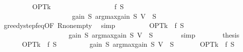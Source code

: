 \begin{isabellebody}
\ \ \ \ \isamarkupfalse%
\ \isamarkupfalse%
\ {\isachardoublequoteopen}{\isasymdots}\ {\isacharequal}{\kern0pt}\ OPT{\isacharunderscore}{\kern0pt}k\isanewline
\ \ \ \ \ \ \ \ \ \ \ \ \ \ \ \ \ {\isacharminus}{\kern0pt}\ {\isacharparenleft}{\kern0pt}f\ {\isacharquery}{\kern0pt}S\isanewline
\ \ \ \ \ \ \ \ \ \ \ \ \ \ \ \ \ \ \ \ {\isacharplus}{\kern0pt}\ gain\ {\isacharquery}{\kern0pt}S\ {\isacharparenleft}{\kern0pt}argmax{\isacharunderscore}{\kern0pt}gain\ {\isacharquery}{\kern0pt}S\ {\isacharparenleft}{\kern0pt}V\ {\isacharminus}{\kern0pt}\ {\isacharquery}{\kern0pt}S{\isacharparenright}{\kern0pt}{\isacharparenright}{\kern0pt}{\isacharparenright}{\kern0pt}{\isachardoublequoteclose}\isanewline
\ \ \ \ \ \ \isamarkupfalse%
\ greedy{\isacharunderscore}{\kern0pt}step{\isacharunderscore}{\kern0pt}f{\isacharunderscore}{\kern0pt}eq{\isacharbrackleft}{\kern0pt}OF\ R{\isacharunderscore}{\kern0pt}nonempty{\isacharbrackright}{\kern0pt}\ \isamarkupfalse%
\ simp\isanewline
\ \ \ \ \isamarkupfalse%
\ \isamarkupfalse%
\ {\isachardoublequoteopen}{\isasymdots}\ {\isacharequal}{\kern0pt}\ OPT{\isacharunderscore}{\kern0pt}k\ {\isacharminus}{\kern0pt}\ f\ {\isacharquery}{\kern0pt}S\isanewline
\ \ \ \ \ \ \ \ \ \ \ \ \ \ \ \ \ \ \ {\isacharminus}{\kern0pt}\ gain\ {\isacharquery}{\kern0pt}S\ {\isacharparenleft}{\kern0pt}argmax{\isacharunderscore}{\kern0pt}gain\ {\isacharquery}{\kern0pt}S\ {\isacharparenleft}{\kern0pt}V\ {\isacharminus}{\kern0pt}\ {\isacharquery}{\kern0pt}S{\isacharparenright}{\kern0pt}{\isacharparenright}{\kern0pt}{\isachardoublequoteclose}\isanewline
\ \ \ \ \ \ \isamarkupfalse%
\ simp\isanewline
\ \ \ \ \isamarkupfalse%
\ \isamarkupfalse%
\ {\isacharquery}{\kern0pt}thesis\ \isakeywordONE{{\isachardot}{\kern0pt}}\isamarkupfalse%
\isanewline
\ \ \isamarkupfalse%
\isanewline
\isanewline
\ \ \isamarkupfalse%
\ {\isachardoublequoteopen}OPT{\isacharunderscore}{\kern0pt}k\ {\isacharminus}{\kern0pt}\ f\ {\isacharquery}{\kern0pt}S\isanewline
\ \ \ \ \ \ \ \ {\isacharminus}{\kern0pt}\ gain\ {\isacharquery}{\kern0pt}S\ {\isacharparenleft}{\kern0pt}argmax{\isacharunderscore}{\kern0pt}gain\ {\isacharquery}{\kern0pt}S\ {\isacharparenleft}{\kern0pt}V\ {\isacharminus}{\kern0pt}\ {\isacharquery}{\kern0pt}S{\isacharparenright}{\kern0pt}{\isacharparenright}{\kern0pt}\isanewline
\ \ \ \ \ \ {\isasymle}\ OPT{\isacharunderscore}{\kern0pt}k\ {\isacharminus}{\kern0pt}\ f\ {\isacharquery}{\kern0pt}S\isanewline

\end{isabellebody}
